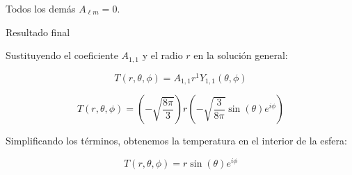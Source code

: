 \documentclass[a4paper]{article}
\begin{document}
Todos los demás $A_{\ell m} = 0$.

Resultado final

Sustituyendo el coeficiente $A_{1,1}$ y el radio $r$ en la solución general:

$$T(r, \theta, \phi) = A_{1,1} r^1 Y_{1,1}(\theta, \phi)$$

$$T(r, \theta, \phi) = \left( -\sqrt{\frac{8\pi}{3}} \right) r \left( -\sqrt{\frac{3}{8\pi}} \sin(\theta)e^{i\phi} \right)$$

Simplificando los términos, obtenemos la temperatura en el interior de la esfera:

$$T(r, \theta, \phi) = r \sin(\theta)e^{i\phi}$$





 
\end{document}
